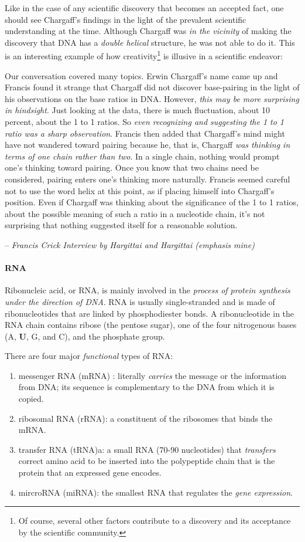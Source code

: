 \documentclass[12pt]{article}
\begin{document}
Like in the case of any scientific discovery that becomes an accepted fact, one should see Chargaff's findings in the light of the prevalent scientific understanding at the time. Although Chargaff was \emph{in the vicinity} of making the discovery that DNA has a \emph{double helical} structure, he was not able to do it. This is an interesting example of how creativity\footnote{Of course, several other factors contribute to a discovery and its acceptance by the scientific community.} is illusive in a scientific endeavor: 
\epigraph{
    Our conversation covered many topics. Erwin Chargaff's name came
up and Francis found it strange that Chargaff did not discover base-pairing
in the light of his observations on the base ratios in DNA. However, \emph{this may be more surprising in hindsight}. Just looking at the data, there is much fluctuation, about 10 percent, about the 1 to 1 ratios. So \emph{even recognizing and suggesting the 1 to 1 ratio was a sharp observation}. Francis then added that Chargaff's mind might have not wandered toward pairing
because he, that is, Chargaff \emph{was thinking in terms of one chain rather than two}. In a single chain, nothing would prompt one's thinking toward pairing. Once you know that two chains need be considered, pairing enters
one's thinking more naturally. Francis seemed careful not to use the word
helix at this point, as if placing himself into Chargaff's position. Even if Chargaff was thinking about the significance of the 1 to 1 ratios, about
the possible meaning of such a ratio in a nucleotide chain, it's not surprising that nothing suggested itself for a reasonable solution.
}
{
    -- \textit{Francis Crick Interview by Hargittai and Hargittai \cite{ih-mh} (emphasis mine)}
}
\paragraph{RNA}
Ribonucleic acid, or RNA, is mainly involved in the \emph{process of protein synthesis under the direction of DNA}. RNA is usually single-stranded and is made of ribonucleotides that are linked by phosphodiester bonds. A ribonucleotide in the RNA chain contains ribose (the pentose sugar), one of the four nitrogenous bases (A, \textbf{U}, G, and C), and the phosphate group.

There are four major \emph{functional} types of RNA:
\begin{enumerate}
    \item messenger RNA (mRNA) : literally \emph{carries} the message or the information from DNA; its sequence is complementary to the DNA from which it is copied.
    \item ribosomal RNA (rRNA): a constituent of the ribosomes that binds the mRNA. 
    \item transfer RNA (tRNA)a: a small RNA (70-90 nucleotides) that \emph{transfers} correct amino acid to be inserted into the polypeptide chain that is the protein that an expressed gene encodes. 
    \item mircroRNA (miRNA): the smallest RNA that regulates the \emph{gene expression}.
\end{enumerate}
\end{document}
